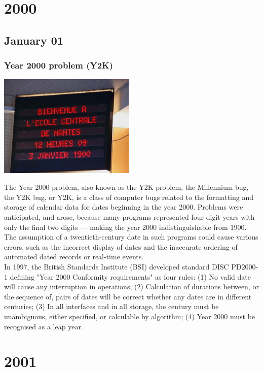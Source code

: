 \documentclass[11pt]{report}
\begin{document}
\chapter{2000}
\section{January 01}
\subsection{Year 2000 problem (Y2K)}
\vspace{2mm}\begin{center}\includegraphics[width=6.5cm]{./img/y2k.jpg}\end{center}
The Year 2000 problem, also known as the Y2K problem, the Millennium bug, the Y2K bug, or Y2K, is a class of computer bugs related to the formatting and storage of calendar data for dates beginning in the year 2000. Problems were anticipated, and arose, because many programs represented four-digit years with only the final two digits — making the year 2000 indistinguishable from 1900. The assumption of a twentieth-century date in such programs could cause various errors, such as the incorrect display of dates and the inaccurate ordering of automated dated records or real-time events.\\
\indent In 1997, the British Standards Institute (BSI) developed standard DISC PD2000-1 defining "Year 2000 Conformity requirements" as four rules: (1) No valid date will cause any interruption in operations; (2) Calculation of durations between, or the sequence of, pairs of dates will be correct whether any dates are in different centuries; (3) In all interfaces and in all storage, the century must be unambiguous, either specified, or calculable by algorithm; (4) Year 2000 must be recognised as a leap year.

\chapter{2001}
\end{document}

